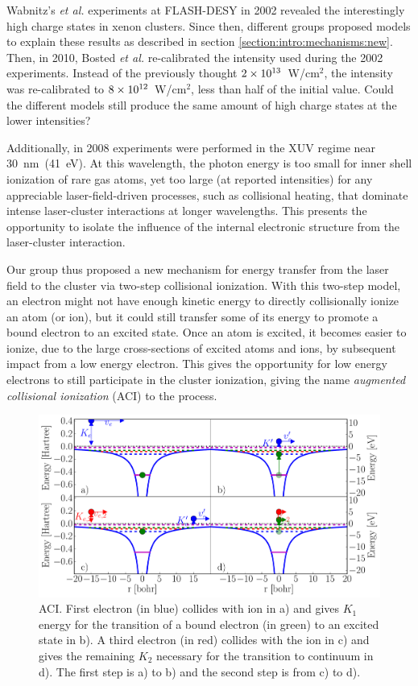 Wabnitz's \textit{et al.} experiments at FLASH-DESY in 2002 revealed the
interestingly high charge states in xenon clusters. Since then, different groups
proposed models to explain these results as described in section
\ref{section:intro:mechanisms:new}.
Then, in 2010, Bosted \textit{et al.}
re-calibrated the intensity used during the 2002 experiments.
Instead of the previously thought $\ten{2}{13}$~W/cm$^2$, the
intensity was
re-calibrated to $\ten{8}{12}$~W/cm$^2$, less than half of the initial value.
Could the different models still produce the same amount of high charge states
at the lower intensities?

Additionally, in 2008 experiments \cite{Bostedt2008,Murphy2008b} were performed
in the XUV regime near 30~nm~(41~eV). At this wavelength, the photon energy is
too small for inner shell ionization of rare gas atoms, yet too large
(at reported intensities) for any appreciable laser-field-driven processes, such
as collisional heating, that dominate intense laser-cluster interactions at
longer wavelengths. This presents the opportunity to isolate the influence of
the internal electronic structure from the laser-cluster interaction.

Our group thus proposed a new mechanism for energy transfer from the laser field
to the cluster %
via two-step collisional ionization.
With this two-step model, an electron might not have enough
kinetic energy to directly collisionally ionize an atom (or ion), but it could still transfer some of
its energy to promote a bound electron to an excited state. Once an atom is
excited, it becomes easier to ionize, due to the large cross-sections of excited
atoms and ions, by subsequent impact from a low energy electron. This gives the
opportunity for low energy electrons to still participate in the cluster
ionization, giving the name \textit{augmented collisional ionization} (ACI) to
the process.

\begin{figure}
 \centering
 \includegraphics[width=\figurewidth]{figures/ionization_aci}
 \caption{ACI. First electron (in blue) collides with ion in a) and gives
          $K_1$ energy for the transition of a bound electron (in green) to an
          excited state in b).
          A third electron (in red) collides with the ion in c) and
          gives the remaining $K_2$ necessary for the transition to continuum
          in d). The first step is a) to b) and the second step is from c) to d).}
 \label{fig:ionization:aci}
\end{figure}

